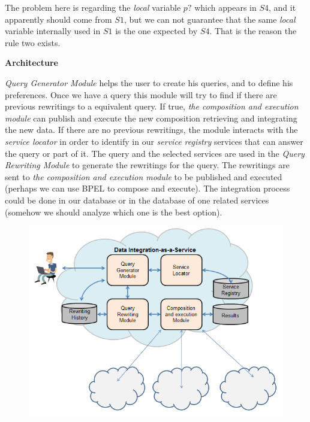 \documentclass[12pt,a4paper,oneside]{article}
\begin{document}
The problem here is regarding the \textit{local} variable $p?$ which appears in $S4$, and it apparently should come from $S1$, but we can not guarantee that the same \textit{local} variable internally used in $S1$ is the one expected by $S4$. 
That is the reason the rule two exists.

\begin{flushleft}
\textbf{Architecture}
\end{flushleft}

\textit{Query Generator Module} helps the user to create his queries, and to define his preferences. 
Once we have a query this module will try to find if there are previous rewritings to a equivalent query. 
If true, \textit{the composition and execution module} can publish and execute the new composition retrieving and integrating the new data.
If there are no previous rewritings, the module interacts with the \textit{service locator} in order to identify in our \textit{service registry} services that can answer the query or part of it.
The query and the selected services are used in the \textit{Query Rewriting Module} to generate the rewritings for the query. 
The rewritings are sent to \textit{the composition and execution module} to be published and executed (perhaps we can use BPEL to compose and execute).
The integration process could be done in our database or in the database of one related services (somehow we should analyze which one is the best option).

\begin{figure}[h]
\center
\includegraphics[scale=0.8]{arch.PNG} 
\end{figure}
\end{document}
